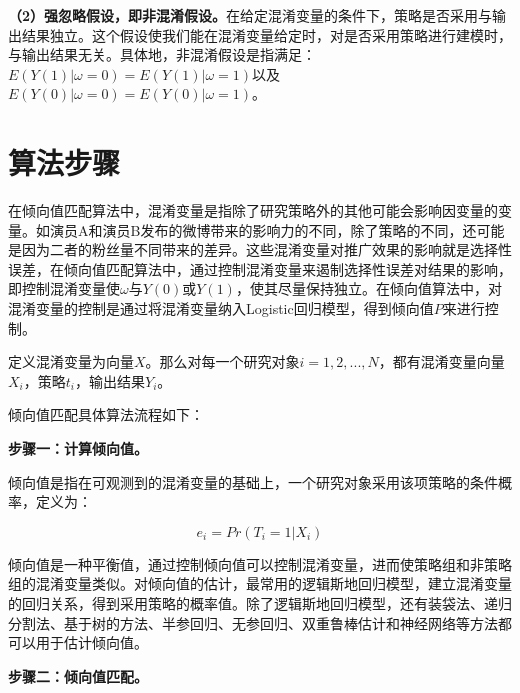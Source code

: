 \textbf{（2）强忽略假设，即非混淆假设。}在给定混淆变量的条件下，策略是否采用与输出结果独立。这个假设使我们能在混淆变量给定时，对是否采用策略进行建模时，与输出结果无关。具体地，非混淆假设是指满足：$E(Y(1)|\omega=0)=E(Y(1)|\omega=1)$以及$E(Y(0)|\omega=0)=E(Y(0)|\omega=1)$。

\section{算法步骤}

在倾向值匹配算法中，混淆变量是指除了研究策略外的其他可能会影响因变量的变量。如演员A和演员B发布的微博带来的影响力的不同，除了策略的不同，还可能是因为二者的粉丝量不同带来的差异。这些混淆变量对推广效果的影响就是选择性误差，在倾向值匹配算法中，通过控制混淆变量来遏制选择性误差对结果的影响，即控制混淆变量使$\omega$与$Y(0)$或$Y(1)$，使其尽量保持独立。在倾向值算法中，对混淆变量的控制是通过将混淆变量纳入Logistic回归模型，得到倾向值$P$来进行控制。

定义混淆变量为向量$X$。那么对每一个研究对象$i=1,2, ...,N$，都有混淆变量向量$X_i$，策略$t_i$，输出结果$Y_i$。

倾向值匹配具体算法流程如下：

\textbf{步骤一：计算倾向值。}

倾向值是指在可观测到的混淆变量的基础上，一个研究对象采用该项策略的条件概率，定义为：

\begin{equation}
e_i = Pr(T_i = 1 | X_i)
\end{equation}

倾向值是一种平衡值，通过控制倾向值可以控制混淆变量，进而使策略组和非策略组的混淆变量类似。对倾向值的估计，最常用的逻辑斯地回归模型，建立混淆变量的回归关系，得到采用策略的概率值。除了逻辑斯地回归模型，还有装袋法、递归分割法、基于树的方法、半参回归、无参回归、双重鲁棒估计和神经网络等方法都可以用于估计倾向值。

\textbf{步骤二：倾向值匹配。}

